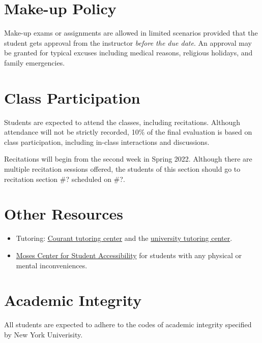\documentclass[letterpaper]{inzane_syllabus} %
\begin{document}
\vspace{0.5cm}
\section{Make-up Policy}
Make-up exams or assignments are allowed in limited scenarios provided that the student gets approval from the instructor \emph{before the due date}. An approval may be granted for typical excuses including medical reasons, religious holidays, and family emergencies.

\vspace{0.5cm}
\section{Class Participation}
Students are expected to attend the classes, including recitations. Although attendance will not be strictly recorded, 10\% of the final evaluation is based on class participation, including in-class interactions and discussions. 

Recitations will begin from the second week in Spring 2022. Although there are multiple recitation sessions offered, the students of this section should go to recitation section \#? scheduled on \#?. 

\vspace{0.5cm}
\section{Other Resources}
\begin{itemize}
  \item Tutoring: \href{https://math.nyu.edu/dynamic/undergrad/ba-cas/tutoring/}{\underline{Courant tutoring center}} and the \href{https://www.nyu.edu/students/academic-services/undergraduate-advisement/academic-resource-center/tutoring-and-learning.html}{university tutoring center}.
  \item \href{https://www.nyu.edu/about/leadership-university-administration/office-of-the-president/office-of-the-provost/university-life/office-of-studentaffairs/student-health-center/moses-center-for-student-accessibility.html}{Moses Center for Student Accessibility} for students with any physical or mental inconveniences.
\end{itemize}

\vspace{0.5cm}
\section{Academic Integrity}
All students are expected to adhere to the codes of academic integrity specified by New York Univerisity.
\end{document}
